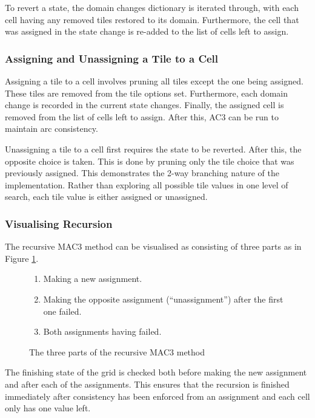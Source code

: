 
To revert a state, the domain changes dictionary is iterated through, with each cell having any removed tiles restored to its domain. Furthermore, the cell that was assigned in the state change is re-added to the list of cells left to assign.

\subsubsection{Assigning and Unassigning a Tile to a Cell}
Assigning a tile to a cell involves pruning all tiles except the one being assigned. These tiles are removed from the tile options set. Furthermore, each domain change is recorded in the current state changes. Finally, the assigned cell is removed from the list of cells left to assign. After this, AC3 can be run to maintain arc consistency.


Unassigning a tile to a cell first requires the state to be reverted. After this, the opposite choice is taken. This is done by pruning only the tile choice that was previously assigned. This demonstrates the 2-way branching nature of the implementation. Rather than exploring all possible tile values in one level of search, each tile value is either assigned or unassigned.

\subsubsection{Visualising Recursion}
The recursive MAC3 method can be visualised as consisting of three parts as in Figure \ref{fig:mac3Recursion}.

\begin{figure}[H]
    \begin{framed}
        \begin{enumerate}
            \item Making a new assignment.
            \item Making the opposite assignment (``unassignment'') after the first one failed.
            \item Both assignments having failed.
        \end{enumerate}
    \end{framed}
    \caption{The three parts of the recursive MAC3 method}
    \label{fig:mac3Recursion}
\end{figure}

The finishing state of the grid is checked both before making the new assignment and after each of the assignments. This ensures that the recursion is finished immediately after consistency has been enforced from an assignment and each cell only has one value left.